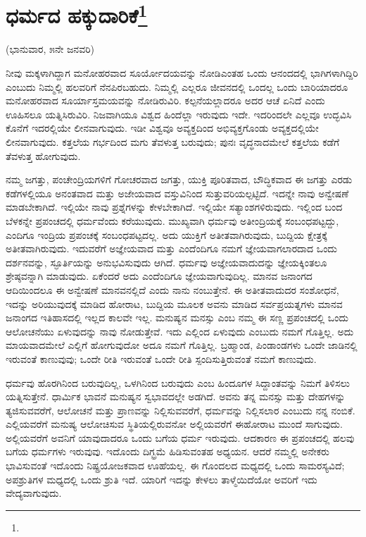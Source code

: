 
\chapter[ಧರ್ಮದ ಹಕ್ಕುದಾರಿಕೆ]{ಧರ್ಮದ ಹಕ್ಕುದಾರಿಕೆ\protect\footnote{}}

\begin{center}
(ಭಾನುವಾರ, ೫ನೇ ಜನವರಿ)
\end{center}

ನೀವು ಮಕ್ಕಳಾಗಿದ್ದಾಗ ಮನೋಹರವಾದ ಸೂರ್ಯೋದಯವನ್ನು ನೋಡಿ\break ಎಂತಹ ಒಂದು ಆನಂದದಲ್ಲಿ ಭಾಗಿಗಳಾಗಿದ್ದಿರಿ ಎಂಬುದು ನಿಮ್ಮಲ್ಲಿ ಹಲವರಿಗೆ ನೆನಪಿರಬಹುದು. ನಿಮ್ಮಲ್ಲಿ ಎಲ್ಲರೂ ಜೀವನದಲ್ಲಿ ಒಂದಲ್ಲ ಒಂದು ಬಾರಿಯಾದರೂ ಮನೋಹರವಾದ ಸೂರ್ಯಾಸ್ತಮಯವನ್ನು ನೋಡಿರುವಿರಿ. ಕಲ್ಪನೆಯಲ್ಲಾದರೂ ಅದರ ಆಚೆ ಏನಿದೆ ಎಂದು ಊಹಿಸಲೂ ಯತ್ನಿಸಿರುವಿರಿ. ನಿಜವಾಗಿಯೂ ವಿಶ್ವದ ಹಿಂದೆಲ್ಲಾ ಇರುವುದು ಇದೇ. ಇದರಿಂದಲೇ ಎಲ್ಲವೂ ಉದ್ಭವಿಸಿ ಕೊನೆಗೆ ಇದರಲ್ಲಿಯೇ ಲೀನವಾಗುವುದು. ಇಡೀ ವಿಶ್ವವೂ ಅವ್ಯಕ್ತದಿಂದ ಅಭಿವ್ಯಕ್ತಗೊಂಡು ಅವ್ಯಕ್ತದಲ್ಲಿಯೇ ಲೀನವಾಗುವುದು. ಕತ್ತಲೆಯ ಗರ್ಭದಿಂದ ಮಗು ತೆವಳುತ್ತ ಬರುವುದು; ಪುನಃ ವೃದ್ಧನಾದಮೇಲೆ ಕತ್ತಲೆಯ ಕಡೆಗೆ ತೆವಳುತ್ತ ಹೋಗುವುದು.

ನಮ್ಮ ಜಗತ್ತು, ಪಂಚೇಂದ್ರಿಯಗಳಿಗೆ ಗೋಚರವಾದ ಜಗತ್ತು, ಯುಕ್ತಿ ಪೂರಿತವಾದ, ಬೌದ್ಧಿಕವಾದ ಈ ಜಗತ್ತು ಎರಡು ಕಡೆಗಳಲ್ಲಿಯೂ ಅನಂತವಾದ ಮತ್ತು ಅಜೇಯವಾದ ವಸ್ತುವಿನಿಂದ ಸುತ್ತುವರಿಯಲ್ಪಟ್ಟಿದೆ. ಇದನ್ನೇ ನಾವು ಅನ್ವೇಷಣೆ ಮಾಡಬೇಕಾಗಿದೆ. ಇಲ್ಲಿಯೇ ನಾವು ಪ್ರಶ್ನೆಗಳನ್ನು ಕೇಳಬೇಕಾಗಿದೆ. ಇಲ್ಲಿಯೇ ಸತ್ಯಾಂಶಗಳಿರುವುದು. ಇಲ್ಲಿಂದ ಬಂದ ಬೆಳಕನ್ನೇ ಪ್ರಪಂಚದಲ್ಲಿ ಧರ್ಮವೆಂದು ಕರೆಯುವುದು. ಮುಖ್ಯವಾಗಿ ಧರ್ಮವು ಅತೀಂದ್ರಿಯಕ್ಕೆ ಸಂಬಂಧಪಟ್ಟದ್ದು, ಎಂದಿಗೂ ಇಂದ್ರಿಯ ಪ್ರಪಂಚಕ್ಕೆ ಸಂಬಂಧಪಟ್ಟದಲ್ಲ. ಅದು ಯುಕ್ತಿಗೆ ಅತೀತವಾಗಿರುವುದು, ಬುದ್ದಿಯ ಕ್ಷೇತ್ರಕ್ಕೆ ಅತೀತವಾಗಿರುವುದು. ಇದುವರೆಗೆ ಅಜ್ಞೇಯವಾದ ಮತ್ತು ಎಂದೆಂದಿಗೂ ನಮಗೆ ಜ್ಞೇಯವಾಗಲಾರದಾದ ಒಂದು ದರ್ಶನವನ್ನು, ಸ್ಫೂರ್ತಿಯನ್ನು ಅನುಭವಿಸುವುದು ಆಗಿದೆ. ಧರ್ಮವು ಅಜ್ಞೇಯವಾದುದನ್ನು ಜ್ಞೇಯಕ್ಕಿಂತಲೂ ಶ್ರೇಷ್ಠವನ್ನಾಗಿ ಮಾಡುವುದು. ಏಕೆಂದರೆ ಅದು ಎಂದೆಂದಿಗೂ ಜ್ಞೇಯವಾಗುವುದಿಲ್ಲ. ಮಾನವ ಜನಾಂಗದ ಆದಿಯಿಂದಲೂ ಈ ಅನ್ವೇಷಣೆ ಮಾನವನಲ್ಲಿದೆ ಎಂದು ನಾನು ನಂಬುತ್ತೇನೆ. ಈ ಅತೀತವಾದುದರ ಸಂಶೋಧನೆ, ಇದನ್ನು ಅರಿಯುವುದಕ್ಕೆ ಮಾಡಿದ ಹೋರಾಟ, ಬುದ್ದಿಯ ಮೂಲಕ ಅವನು ಮಾಡಿದ ಸರ್ವಪ್ರಯತ್ನಗಳು ಮಾನವ ಜನಾಂಗದ ಇತಿಹಾಸದಲ್ಲಿ ಇಲ್ಲದ ಕಾಲವೇ ಇಲ್ಲ. ಮನುಷ್ಯನ ಮನಸ್ಸು ಎಂಬ ನಮ್ಮ ಈ ಸಣ್ಣ ಪ್ರಪಂಚದಲ್ಲಿ ಒಂದು ಆಲೋಚನೆಯು ಏಳುವುದನ್ನು ನಾವು ನೋಡುತ್ತೇವೆ. ಇದು ಎಲ್ಲಿಂದ ಏಳುವುದು ಎಂಬುದು ನಮಗೆ ಗೊತ್ತಿಲ್ಲ. ಅದು ಮಾಯವಾದಮೇಲೆ ಎಲ್ಲಿಗೆ ಹೋಗುವುದೋ ಅದೂ ನಮಗೆ ಗೊತ್ತಿಲ್ಲ. ಬ್ರಹ್ಮಾಂಡ, ಪಿಂಡಾಂಡಗಳು ಒಂದೇ ಜಾಡಿನಲ್ಲಿ ಇರುವಂತೆ ಕಾಣುವುವು; ಒಂದೇ ರೀತಿ ಇರುವಂತೆ ಒಂದೇ ರೀತಿ ಸ್ಪಂದಿಸುತ್ತಿರುವಂತೆ ನಮಗೆ ಕಾಣುವುದು.

ಧರ್ಮವು ಹೊರಗಿನಿಂದ ಬರುವುದಿಲ್ಲ, ಒಳಗಿನಿಂದ ಬರುವುದು ಎಂಬ ಹಿಂದೂಗಳ ಸಿದ್ದಾಂತವನ್ನು ನಿಮಗೆ ತಿಳಿಸಲು ಯತ್ನಿಸುತ್ತೇನೆ. ಧಾರ್ಮಿಕ ಭಾವನೆ ಮನುಷ್ಯನ ಸ್ವಭಾವದಲ್ಲೇ ಅಡಗಿದೆ. ಅವನು ತನ್ನ ಮನಸ್ಸು ಮತ್ತು ದೇಹಗಳನ್ನು ತ್ಯಜಿಸುವವರೆಗೆ, ಆಲೋಚನೆ ಮತ್ತು ಪ್ರಾಣವನ್ನು ನಿಲ್ಲಿಸುವವರೆಗೆ, ಧರ್ಮವನ್ನು ನಿಲ್ಲಿಸಲಾರ ಎಂಬುದು ನನ್ನ ನಂಬಿಕೆ. ಎಲ್ಲಿಯವರೆಗೆ ಮನುಷ್ಯ ಆಲೋಚಿಸುವ ಸ್ಥಿತಿಯಲ್ಲಿರುವನೋ ಅಲ್ಲಿಯವರೆಗೆ ಈ\break ಹೋರಾಟ ಮುಂದೆ ಸಾಗುವುದು. ಅಲ್ಲಿಯವರೆಗೆ ಅವನಿಗೆ ಯಾವುದಾದರೂ ಒಂದು ಬಗೆಯ ಧರ್ಮ ಇರುವುದು. ಆದಕಾರಣ ಈ ಪ್ರಪಂಚದಲ್ಲಿ ಹಲವು ಬಗೆಯ ಧರ್ಮಗಳು ಇರುವುವು. ಇದೊಂದು ದಿಗ್ಭ್ರಮೆ ಹಿಡಿಸುವಂತಹ ಅಧ್ಯಯನ. ಆದರೆ ನಮ್ಮಲ್ಲಿ ಅನೇಕರು ಭಾವಿಸುವಂತೆ ಇದೊಂದು ನಿಷ್ಪ್ರಯೋಜಕವಾದ ಊಹೆಯಲ್ಲ. ಈ ಗೊಂದಲದ ಮಧ್ಯದಲ್ಲಿ ಒಂದು ಸಾಮರಸ್ಯವಿದೆ; ಅಪಶ್ರುತಿಗಳ ಮಧ್ಯದಲ್ಲಿ ಒಂದು ಶ್ರುತಿ ಇದೆ. ಯಾರಿಗೆ ಇದನ್ನು ಕೇಳಲು ತಾಳ್ಮೆಯಿದೆಯೋ ಅವರಿಗೆ ಇದು ವೇದ್ಯವಾಗುವುದು.

